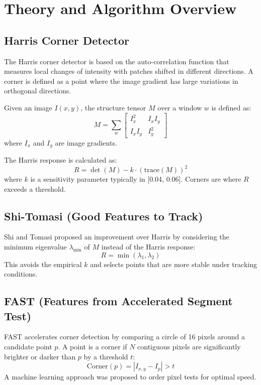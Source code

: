 \section{Theory and Algorithm Overview}

\subsection{Harris Corner Detector}
The Harris corner detector \cite{Harris_Corner} is based on the auto-correlation function that measures local changes of intensity with patches shifted in different directions. A corner is defined as a point where the image gradient has large variations in orthogonal directions.

Given an image $I(x, y)$, the structure tensor $M$ over a window $w$ is defined as:
\begin{equation}
M = \sum_w \begin{bmatrix} I_x^2 & I_x I_y \\ I_x I_y & I_y^2 \end{bmatrix}
\end{equation}
where $I_x$ and $I_y$ are image gradients.

The Harris response is calculated as:
\begin{equation}
R = \det(M) - k \cdot (\text{trace}(M))^2
\end{equation}
where $k$ is a sensitivity parameter typically in [0.04, 0.06]. Corners are where $R$ exceeds a threshold.

\subsection{Shi-Tomasi (Good Features to Track)}
Shi and Tomasi \cite{Shi_Tomasi} proposed an improvement over Harris by considering the minimum eigenvalue $\lambda_{\min}$ of $M$ instead of the Harris response:
\begin{equation}
R = \min(\lambda_1, \lambda_2)
\end{equation}
This avoids the empirical $k$ and selects points that are more stable under tracking conditions.

\subsection{FAST (Features from Accelerated Segment Test)}
FAST \cite{FAST} accelerates corner detection by comparing a circle of 16 pixels around a candidate point $p$. A point is a corner if $N$ contiguous pixels are significantly brighter or darker than $p$ by a threshold $t$:
\begin{equation}
\text{Corner}(p) = \left| I_{x,y} - I_p \right| > t
\end{equation}
A machine learning approach was proposed to order pixel tests for optimal speed.

